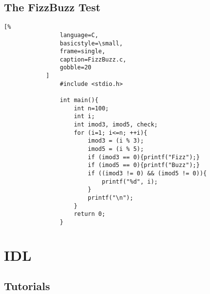 \documentclass[crop=false,class=book,oneside]{standalone}
\begin{document}
        \subsection{The FizzBuzz Test}
            \begin{lstlisting}[%
                language=C,
                basicstyle=\small,
                frame=single,
                caption=FizzBuzz.c,
                gobble=20
            ]
                #include <stdio.h>

                int main(){
                    int n=100;
                    int i;
                    int imod3, imod5, check;
                    for (i=1; i<=n; ++i){
                        imod3 = (i % 3);
                        imod5 = (i % 5);
                        if (imod3 == 0){printf("Fizz");}
                        if (imod5 == 0){printf("Buzz");}
                        if ((imod3 != 0) && (imod5 != 0)){
                            printf("%d", i);
                        }
                        printf("\n");
                    }
                    return 0;
                }
            \end{lstlisting}
    \section{IDL}
        \subsection{Tutorials}
\end{document}
